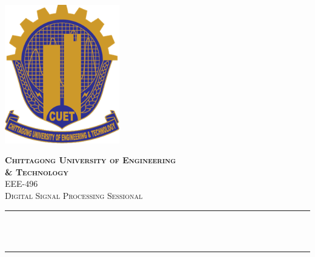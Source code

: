 \begin{titlepage}

\newcommand{\HRule}{\rule{\linewidth}{0.5mm}} %

\centering
\includegraphics[width=5cm]{figure/cuet.png}\\[1cm] %
 

\center %


\textsc{\huge \textbf{ Chittagong University of Engineering \\[.3cm] \& Technology}}\\[1.5cm] 
\textsc{\Large EEE-496}\\[0.5cm] 
\textsc{\large Digital Signal Processing Sessional}\\[0.5cm] 

\makeatletter
\HRule \\[0.4cm]
{ \large \bfseries \@title}\\[0.4cm] %
\HRule \\[1.5cm]
 


\end{titlepage}
